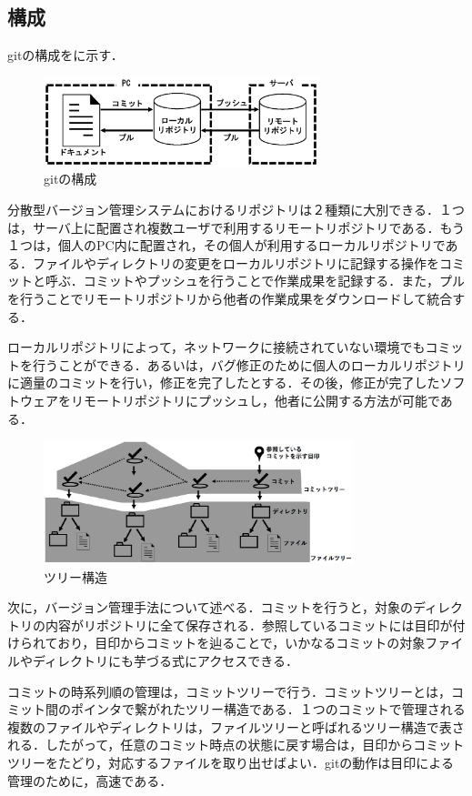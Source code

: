 \documentclass[a4j,9pt,twocolumn]{jsarticle}
\begin{document}
\subsection{構成}
gitの構成をに示す．

\begin{figure}[h]
\centering
\includegraphics[width=80mm]{img/git.eps}
\caption{gitの構成}
\label{git}
\end{figure}

分散型バージョン管理システムにおけるリポジトリは２種類に大別できる．１つは，サーバ上に配置され複数ユーザで利用するリモートリポジトリである．もう１つは，個人のPC内に配置され，その個人が利用するローカルリポジトリである．ファイルやディレクトリの変更をローカルリポジトリに記録する操作をコミットと呼ぶ．コミットやプッシュを行うことで作業成果を記録する．また，プルを行うことでリモートリポジトリから他者の作業成果をダウンロードして統合する．

ローカルリポジトリによって，ネットワークに接続されていない環境でもコミットを行うことができる．あるいは，バグ修正のために個人のローカルリポジトリに適量のコミットを行い，修正を完了したとする．その後，修正が完了したソフトウェアをリモートリポジトリにプッシュし，他者に公開する方法が可能である．

\begin{figure}[h]
\centering
\includegraphics[width=90mm]{img/tree2.eps}
\caption{ツリー構造}
\label{tree}
\end{figure}

次に，バージョン管理手法について述べる．コミットを行うと，対象のディレクトリの内容がリポジトリに全て保存される．参照しているコミットには目印が付けられており，目印からコミットを辿ることで，いかなるコミットの対象ファイルやディレクトリにも芋づる式にアクセスできる．

コミットの時系列順の管理は，コミットツリーで行う．コミットツリーとは，コミット間のポインタで繋がれたツリー構造である．１つのコミットで管理される複数のファイルやディレクトリは，ファイルツリーと呼ばれるツリー構造で表される．したがって，任意のコミット時点の状態に戻す場合は，目印からコミットツリーをたどり，対応するファイルを取り出せばよい．gitの動作は目印による管理のために，高速である．
\end{document}
